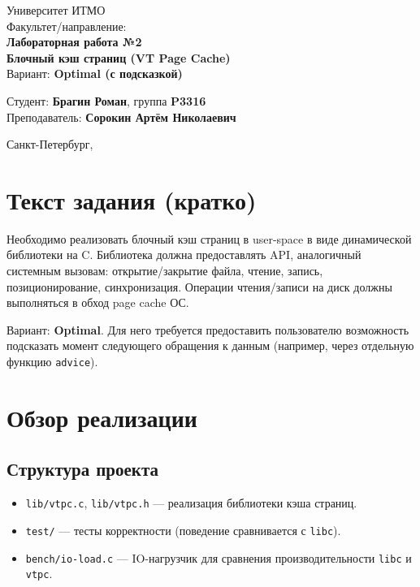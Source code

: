 \documentclass[12pt,a4paper]{article}
\begin{document}
\begin{titlepage}
  \begin{center}
    {\large Университет ИТМО}\\[4mm]
    {\large Факультет/направление: \underline{\hspace{7cm}}}\\[10mm]

    {\LARGE \textbf{Лабораторная работа №2}}\\[2mm]
    {\Large \textbf{Блочный кэш страниц (VT Page Cache)}}\\[6mm]

    {\large Вариант: \textbf{Optimal (с подсказкой)}}\\[12mm]
  \end{center}

  \vfill

  \begin{flushleft}
    Студент: \textbf{Брагин Роман}, группа \textbf{P3316}\\
    Преподаватель: \textbf{Сорокин Артём Николаевич}\\
  \end{flushleft}

  \vfill
  \begin{center}
    Санкт-Петербург, \the\year
  \end{center}
\end{titlepage}

\section{Текст задания (кратко)}
Необходимо реализовать блочный кэш страниц в user-space в виде динамической библиотеки на C.
Библиотека должна предоставлять API, аналогичный системным вызовам: открытие/закрытие файла, чтение, запись, позиционирование, синхронизация.
Операции чтения/записи на диск должны выполняться в обход page cache ОС.

Вариант: \textbf{Optimal}. Для него требуется предоставить пользователю возможность подсказать момент следующего обращения к данным (например, через отдельную функцию \texttt{advice}).

\section{Обзор реализации}
\subsection{Структура проекта}
\begin{itemize}
  \item \texttt{lib/vtpc.c}, \texttt{lib/vtpc.h} --- реализация библиотеки кэша страниц.
  \item \texttt{test/} --- тесты корректности (поведение сравнивается с \texttt{libc}).
  \item \texttt{bench/io-load.c} --- IO-нагрузчик для сравнения производительности \texttt{libc} и \texttt{vtpc}.
\end{itemize}
\end{document}
